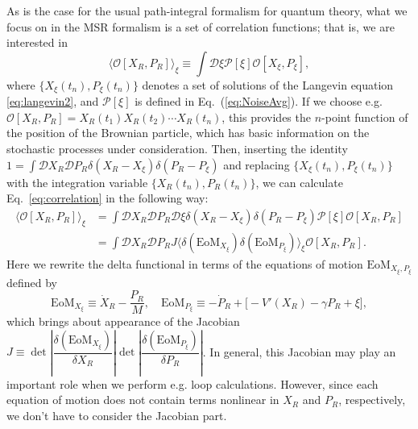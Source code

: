 \documentclass[a4paper,11pt]{article}
\begin{document}
As is the case for the usual path-integral formalism for quantum theory, 
what we focus on in the MSR formalism is a set of correlation functions;
that is, we are interested in
\begin{equation}
 \langle \mathcal{O}[X_R,P_R] \rangle_\xi 
  \equiv \int \mathcal{D} \xi \mathcal P[\xi] \mathcal{O}[X_\xi,P_\xi], 
  \label{eq:correlation}
\end{equation}
where $\{X_\xi(t_n), P_\xi(t_n)\}$ 
denotes a set of solutions of the Langevin equation 
\eqref{eq:langevin2}, and $\mathcal P[\xi]$ is defined in Eq.~(\ref{eq:NoiseAvg}).
If we choose e.g. 
$\mathcal{O}[X_R,P_R] = X_R(t_1) X_R(t_2) \cdots X_R(t_n)$, this provides 
the $n$-point function of the position of the Brownian particle, 
which has basic information on the stochastic processes under consideration.
Then, inserting the identity 
$1 = \displaystyle{\int} \mathcal{D} X_R \mathcal{D} P_R
 \delta (X_R - X_\xi ) \delta (P_R - P_\xi )$ and 
replacing $\{X_\xi (t_n), P_\xi(t_n)\}$ with the integration variable 
$\{X_R(t_n), P_R(t_n)\}$, we can calculate Eq.~\eqref{eq:correlation} 
in the following way:
\begin{equation}
 \begin{split}
  \langle \mathcal{O}[X_R ,P_R] \rangle_\xi
  &= \int \mathcal{D} X_R  \mathcal{D} P_R \mathcal{D} \xi 
  \delta (X_R - X_\xi)  \delta (P_R - P_\xi) \mathcal P[\xi]
  \mathcal{O}[X_R,P_R] \\
  &= \int \mathcal{D} X_R \mathcal{D} P_R  J 
  \big\langle \delta (\mathrm{EoM}_{X_\xi}) \delta (\mathrm{EoM}_{P_\xi} )
  \big\rangle_\xi 
  \mathcal{O}[X_R,P_R] .
  \label{eq:2.9}
   \end{split}
\end{equation}
Here we rewrite the delta functional in terms of the 
equations of motion $\mathrm{EoM}_{X_\xi, P_\xi}$ defined by
\begin{equation}
 \mathrm{EoM}_{X_\xi}
 \equiv 
   \dot{X}_R - \frac{P_R}{M} , \quad
   \mathrm{EoM}_{P_\xi}
 \equiv 
  - \dot{P}_R + \big[ - V'(X_R) - \gamma P_R + \xi \big],
\end{equation}
which brings about appearance of the Jacobian 
$J \equiv \det \left| \dfrac{\delta (\mathrm{EoM}_{X_\xi})}{\delta X_R} \right|
\det \left| \dfrac{\delta (\mathrm{EoM}_{P_\xi})}{\delta P_R} \right|$.
In general, this Jacobian may play an important role when we perform 
e.g. loop calculations. 
However, since each equation of motion does not contain terms nonlinear
in $X_R$ and $P_R$, respectively,
we don't have to consider the Jacobian part.
\end{document}
